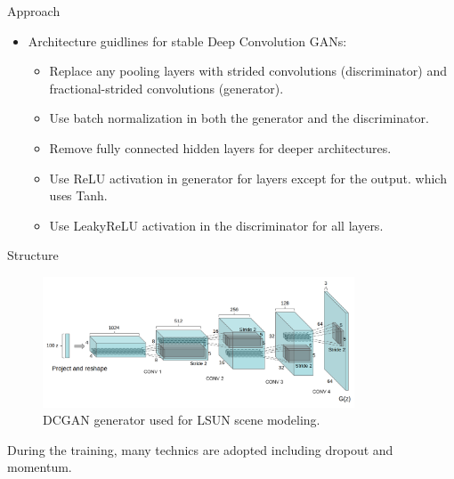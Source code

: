 \documentclass[10pt]{beamer}
\begin{document}
	\begin{frame}{Approach}
		\begin{itemize}
			\item Architecture guidlines for stable Deep Convolution GANs:
			\begin{itemize}
				\pause
				\item Replace any pooling layers with strided convolutions (discriminator) and fractional-strided convolutions (generator).
				\pause
				\item Use batch normalization in both the generator and the discriminator.
				\pause
				\item Remove fully connected hidden layers for deeper architectures.
				\pause
				\item Use ReLU activation in generator for layers except for the output. which uses Tanh.
				\pause
				\item Use LeakyReLU activation in the discriminator for all layers.
			\end{itemize}
		\end{itemize}
	\end{frame}

	\begin{frame}{Structure}
		\begin{figure}
			\includegraphics[width=25em]{figures/DCGAN-generator-structure.png}
			\caption{DCGAN generator used for LSUN scene modeling.}
		\end{figure}
		\pause
		During the training, many technics are adopted including dropout and momentum.
	\end{frame}
\end{document}
